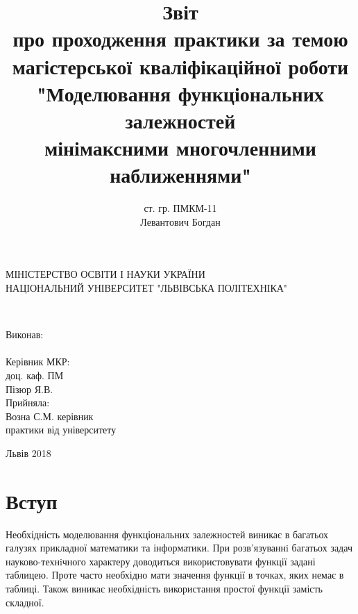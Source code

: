 \documentclass[ukrainian,14pt]{extarticle}
\begin{document}
\title{
	Звіт \\
про проходження практики за темою \\
магістерської кваліфікаційної роботи\\
"Моделювання функціональних залежностей \\
мінімаксними многочленними наближеннями"
}
\author{ст. гр. ПМКМ-11 \\  Левантович Богдан}

\makeatletter
\begin{titlepage}
        \centering
	МІНІСТЕРСТВО ОСВІТИ І НАУКИ УКРАЇНИ \\
	НАЦІОНАЛЬНИЙ УНІВЕРСИТЕТ "ЛЬВІВСЬКА ПОЛІТЕХНІКА"
	\vspace{\fill}

	\@title \\
	\vspace{120pt}
	\raggedright
        \setlength{\leftskip}{11cm}
	Виконав:\\
	\@author\\
        Керівник МКР:\\
       доц. каф. ПМ \\
       Пізюр Я.В.\\
       Прийняла: \\
       Возна С.М. керівник \\
       практики від університету\\
        \setlength{\leftskip}{0cm}
	\vspace{110pt}
	\centering


	Львів 2018
\end{titlepage}
\makeatother

\setcounter{page}{2}
\tableofcontents

\newpage


\section*{Вступ}




Необхідність моделювання функціональних залежностей виникає в
багатьох галузях прикладної математики та інформатики. При розв’язуваннi
багатьох задач науково-технiчного характеру доводиться використовувати
функції задані таблицею. Проте часто необхідно мати значення функції в
точках, яких немає в таблиці. Також виникає необхідність використання простої
функції замість складної.
\end{document}
